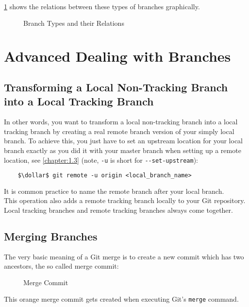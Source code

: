 \cref{fig:GitBranchTypes} shows the relations between these types of branches graphically.
\begin{figure}[H]
	\centering
	
	\caption{Branch Types and their Relations}
	\label{fig:GitBranchTypes}
\end{figure}



\section{Advanced Dealing with Branches}
\label{chapter:3.4}



\subsection{Transforming a Local Non-Tracking Branch into a Local Tracking Branch}
\label{chapter:3.4.1}


In other words, you want to transform a local non-tracking branch into a local tracking branch by creating a real 
remote branch version of your simply local branch. To achieve this, you just 
have to set an upstream location for your local branch exactly as you did it with your master branch when setting 
up a remote location, see \cref{chapter:1.3} (note, \verb|-u| is short for \verb|--set-upstream|):

\begin{lstlisting}
	$\dollar$ git remote -u origin <local_branch_name>
\end{lstlisting}

It is common practice to name the remote branch after your local branch.
\\
This operation also adds a remote tracking branch locally to your Git repository. Local tracking branches and remote
tracking branches always come together.



\subsection{Merging Branches}
\label{chapter:3.4.2}

The very basic meaning of a Git merge is to create a new commit which has two ancestors, the so called merge 
commit:
\begin{figure}[H]
	\centering
	
	\caption{Merge Commit}
	\label{fig:mergeCommit}
\end{figure}
This orange merge commit gets created when executing Git's \verb|merge| command.



